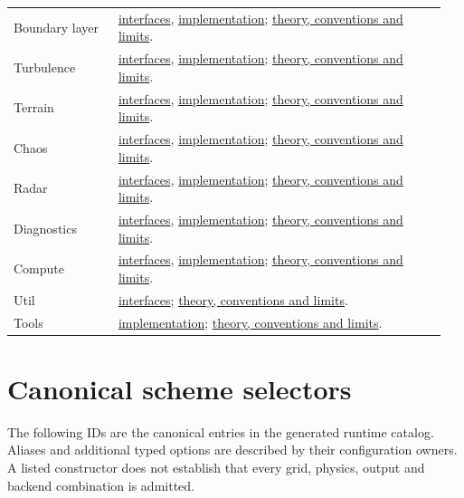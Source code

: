 \begin{longtable}{@{}p{0.23\linewidth}p{0.72\linewidth}@{}}
Boundary layer & \href{../include/boundary_layer}{interfaces}, \href{../src/boundary_layer}{implementation}; \hyperref[mixing-theory]{theory, conventions and limits}. \\
Turbulence & \href{../include/turbulence}{interfaces}, \href{../src/turbulence}{implementation}; \hyperref[mixing-theory]{theory, conventions and limits}. \\
Terrain & \href{../include/terrain}{interfaces}, \href{../src/terrain}{implementation}; \hyperref[grid-deep-dive]{theory, conventions and limits}. \\
Chaos & \href{../include/chaos}{interfaces}, \href{../src/chaos}{implementation}; \hyperref[chaos-theory]{theory, conventions and limits}. \\
Radar & \href{../include/radar}{interfaces}, \href{../src/radar}{implementation}; \hyperref[radar-diagnostics-theory]{theory, conventions and limits}. \\
Diagnostics & \href{../include/diagnostics}{interfaces}, \href{../src/diagnostics}{implementation}; \hyperref[radar-diagnostics-theory]{theory, conventions and limits}. \\
Compute & \href{../include/compute}{interfaces}, \href{../src/compute}{implementation}; \hyperref[precision-reproducibility-and-scientific-interpretation]{theory, conventions and limits}. \\
Util & \href{../include/util}{interfaces}; \hyperref[precision-reproducibility-and-scientific-interpretation]{theory, conventions and limits}. \\
Tools & \href{../src/tools}{implementation}; \hyperref[coefficient-data-and-numerical-contracts]{theory, conventions and limits}. \\
\end{longtable}

\section{Canonical scheme selectors}
The following IDs are the canonical entries in the generated runtime
catalog. Aliases and additional typed options are described by their
configuration owners. A listed constructor does not establish that
every grid, physics, output and backend combination is admitted.

